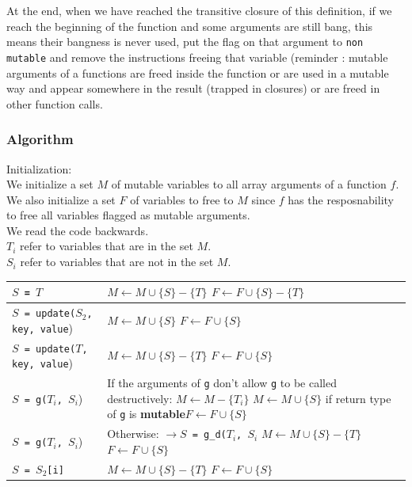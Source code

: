 \documentclass[12pt,a4paper,titlepage]{article}
\newcommand{\cl}[1]{\texttt{#1}}
\newcommand{\mut}{\textbf{mutable}}
\begin{document}
At the end, when we have reached the transitive closure of this definition, if we reach the beginning of the function and some arguments are still bang, this means their bangness is never used, put the flag on that argument to \cl{non mutable} and remove the instructions freeing that variable (reminder : mutable arguments of a functions are freed inside the function or are used in a mutable way and appear somewhere in the result (trapped in closures) or are freed in other function calls.

\subsubsection{Algorithm}

Initialization:\\
We initialize a set $M$ of mutable variables to all array arguments of a function $f$.
We also initialize a set $F$ of variables to free to $M$ since $f$ has the resposnability to free all variables flagged as mutable arguments.\\

We read the code backwards.\\
$T_i$ refer to variables that are in the set $M$.\\
$S_i$ refer to variables that are not in the set $M$.

\begin{tabular}{|p{60mm}|p{90mm}|}
\hline
\cl{$S$ = $T$} & $M \leftarrow M \cup \{ S \} - \{T\}$ \newline $F \leftarrow F \cup \{ S \} - \{T\}$  \\ \hline
\cl{$S$ = update($S_2$, key, value}) & $M \leftarrow M \cup \{ S \}$ \newline $F \leftarrow F \cup \{ S \}$ \\ \hline
\cl{$S$ = update($T$, key, value}) & $M \leftarrow M \cup \{ S \}  - \{T\}$ \newline $F \leftarrow F \cup \{ S \}$ \\ \hline

\cl{$S$ = g($T_i$, $S_i$}) & If the arguments of \cl{g} don't allow \cl{g} to be called destructively: \newline $M \leftarrow M - \{T_i \}$ \newline $M \leftarrow M \cup \{ S \}$ if return type of \cl{g} is \mut \newline $F \leftarrow F \cup \{ S\}$ \\ \hline

\cl{$S$ = g($T_i$, $S_i$}) & Otherwise: \newline \cl{$\rightarrow S$ = g\_d($T_i$, $S_i$} \newline $M \leftarrow M \cup \{ S \}  - \{T\}$ \newline $F \leftarrow F \cup \{ S \}$ \\ \hline

\cl{$S$ = $S_2$[i]} & $M \leftarrow M \cup \{ S \}  - \{T\}$ \newline $F \leftarrow F \cup \{ S \}$ \\ \hline


\end{tabular}
\end{document}
